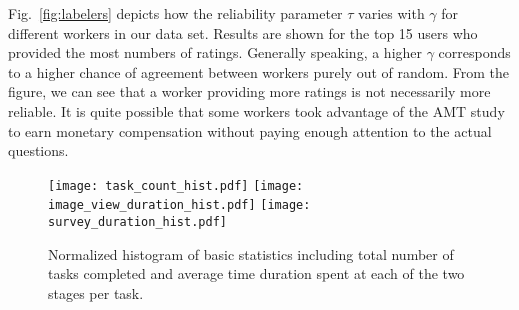 \documentclass[10pt,journal,letterpaper,compsoc,twoside]{IEEEtran}
\begin{document}
Fig.~\ref{fig:labelers} depicts how the reliability parameter $\tau$ varies with $\gamma$ for different workers in our data set. 
Results are shown for the top 15 users who provided the most numbers of ratings. 
Generally speaking, a higher $\gamma$ corresponds to a higher chance of agreement between workers purely out of random.
From the figure, we can see that a worker providing more ratings is not necessarily more reliable. 
It is quite possible that some workers took advantage of the AMT study
to {earn monetary compensation without paying enough attention to the actual questions}. 

\begin{figure*}[ht!]
\texttt{[image: task\_count\_hist.pdf]}
\texttt{[image: image\_view\_duration\_hist.pdf]}
\texttt{[image: survey\_duration\_hist.pdf]}
\caption{Normalized histogram of basic statistics including total number of tasks completed and 
average time duration spent at each of the two stages per task.}\label{fig:hist}
\end{figure*}
\end{document}

